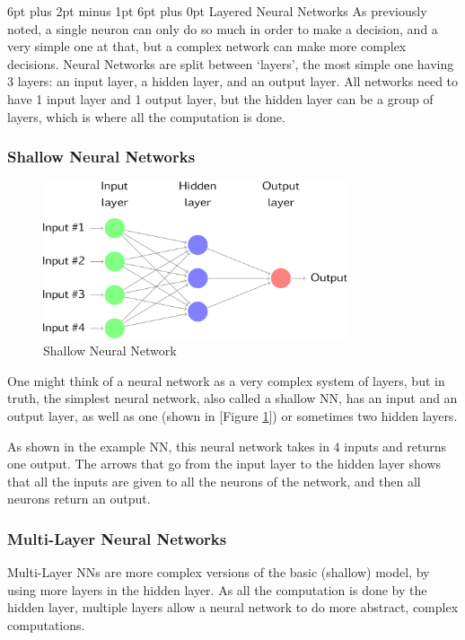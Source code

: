 \documentclass[12pt,a4paper]{article}
\makeatletter
\renewcommand\subsection{\@startsection {subsection}{1}{2mm} %
                               {6pt plus 2pt minus 1pt} %
                               {6pt plus 0pt} %
                               {\normalfont\bfseries}}
\makeatother
\begin{document}
\subsection{Layered Neural Networks}
As previously noted, a single neuron can only do so much in order to make a decision, and a very simple one at that, but a complex network can make more complex decisions. Neural Networks are split between ‘layers’, the most simple one having 3 layers: an input layer, a hidden layer, and an output layer. All networks need to have 1 input layer and 1 output layer, but the hidden layer can be a group of layers, which is where all the computation is done.
\subsubsection{Shallow Neural Networks}
\begin{figure}[ht]
	\includegraphics[width=0.8\textwidth]{shallow}
	\centering
	\caption{Shallow Neural Network  \protect \cite{rob_j_hyndman_forecasting:_2018}}
	\label{fig:2}
\end{figure}
One might think of a neural network as a very complex system of layers, but in truth, the simplest neural network, also called a shallow NN, has an input and an output layer, as well as one (shown in [Figure \ref{fig:2}]) or sometimes two hidden layers.\par
As shown in the example NN, this neural network takes in 4 inputs and returns one output. The arrows that go from the input layer to the hidden layer shows that all the inputs are given to all the neurons of the network, and then all neurons return an output.
\subsubsection{Multi-Layer Neural Networks}
Multi-Layer NNs are more complex versions of the basic (shallow) model, by using more layers in the hidden layer. As all the computation is done by the hidden layer, multiple layers allow a neural network to do more abstract, complex computations.\par
\end{document}
